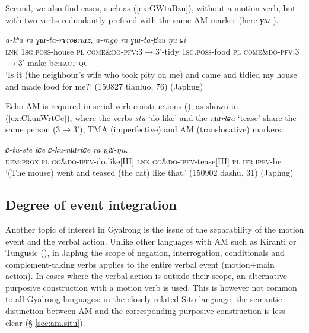 \documentclass[oneside,a4paper,11pt]{article}
\newcommand{\ipa}[1]{{\phon\textit{#1}}}
\newcommand{\forme}[1]{\textit{\phon#1}}
\newcommand{\japhug}[2]{\textit{\phon#1} `#2'}
\newcommand{\rouge}[1]{{\color{red}#1}}
\begin{document}
Second, we also find cases, such as (\ref{ex:GWtaBzu}), without a motion verb, but with two verbs redundantly prefixed with the same AM marker (here \forme{ɣɯ-}).

\begin{exe}
\ex \label{ex:GWtaBzu}
\gll \ipa{tɕe}	\ipa{a-kʰa}	\ipa{ra}	\ipa{\rouge{ɣɯ}-ta-rɤroʁrɯz,}	\ipa{a-mgo}	\ipa{ra}	\ipa{\rouge{ɣɯ}-ta-βzu}	\ipa{ŋu}	\ipa{ɕi} \\
\textsc{lnk} \textsc{1sg}.\textsc{poss}-house \textsc{pl} \rouge{\textsc{come\&do}}-\textsc{pfv}:3$\rightarrow$3'-tidy 
 \textsc{1sg}.\textsc{poss}-food \textsc{pl} \rouge{\textsc{come\&do}}-\textsc{pfv}:3$\rightarrow$3'-make be:\textsc{fact} \textsc{qu} \\ 
\glt `Is it (the neighbour's wife who took pity on me) and came and tidied my house and made food for me?'  (150827 tianluo, 76) (Japhug)
\end{exe}


Echo AM is required in serial verb constructions (\citealt[253-255]{jacques16complementation}), as shown in (\ref{ex:CkunWrtCe}), where the verbs \japhug{stu}{do like} and the \japhug{nɯrtɕa}{tease} share the same person (3$\rightarrow$3'), TMA (imperfective) and AM (translocative) markers.

\begin{exe}
\ex \label{ex:CkunWrtCe}
\gll \ipa{kɯra}	\ipa{\rouge{ɕ}-tu-ste}	\ipa{tɕe}	\ipa{\rouge{ɕ}-ku-nɯrtɕe}	\ipa{ra}	\ipa{pjɤ-ŋu.} \\
\textsc{dem}:\textsc{prox}:\textsc{pl} \rouge{\textsc{go\&do}}-\textsc{ipfv}-do.like[III] \textsc{lnk}  \rouge{\textsc{go\&do}}-\textsc{ipfv}-tease[III] \textsc{pl} \textsc{ifr}.\textsc{ipfv}-be \\
\glt `(The mouse) went and teased (the cat) like that.' (150902 dashu, 31) (Japhug)
\end{exe}


 \subsection{Degree of event integration} \label{sec:am.japhug}
Another topic of interest in Gyalrong is the issue of the separability of the motion event and the verbal action. Unlike other languages with AM such as Kiranti or Tungusic (\citealt{stojnova16nda, fuente18am}), in Japhug the scope of negation, interrogation, conditionals and complement-taking verbs applies to the entire verbal event (motion+main action). In cases where the verbal action is outside their scope, an alternative purposive construction with a motion verb is used. This is however not common to all Gyalrong languages: in the closely related Situ language, the semantic distinction between AM and the corresponding purposive construction is less clear (§ \ref{sec:am.situ}). 
 
\end{document}
